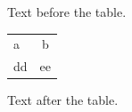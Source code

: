 \documentclass[12pt]{article}
\begin{document}
Text before the table.

\begin{tabular}{|l|c|}a & b\\dd & ee\end{tabular}

Text after the table.
\end{document}
